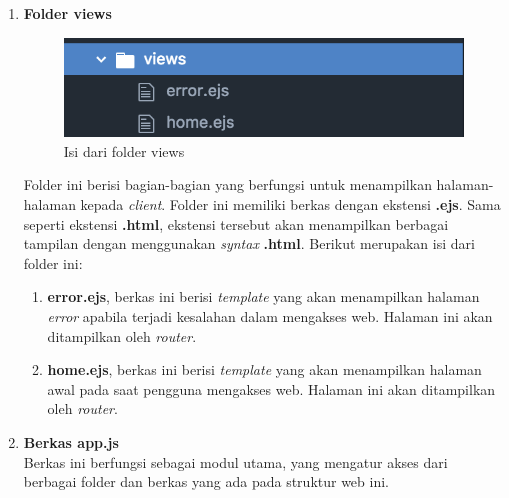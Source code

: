 \begin{enumerate}
	\item \textbf{Folder views} \\
	
	\begin{figure}[H]
		\centering
		\includegraphics[scale=0.4]{Gambar/direktori_views}
		\caption{Isi dari folder views}
		\label{fig:direktori_views}
	\end{figure}
	
	Folder ini berisi bagian-bagian yang berfungsi untuk menampilkan halaman-halaman kepada \textit{client}. Folder ini memiliki berkas dengan ekstensi \textbf{.ejs}. Sama seperti ekstensi \textbf{.html}, ekstensi tersebut akan menampilkan berbagai tampilan dengan menggunakan \textit{syntax} \textbf{.html}. Berikut merupakan isi dari folder ini:
	
	\begin{enumerate}
		\item \textbf{error.ejs}, berkas ini berisi \textit{template} yang akan menampilkan halaman \textit{error} apabila terjadi kesalahan dalam mengakses web. Halaman ini akan ditampilkan oleh \textit{router}.
		
		\item \textbf{home.ejs}, berkas ini berisi \textit{template} yang akan menampilkan halaman awal pada saat pengguna mengakses web. Halaman ini akan ditampilkan oleh \textit{router}.
	\end{enumerate}
	
	
	\item \textbf{Berkas app.js} \\ 
	Berkas ini berfungsi sebagai modul utama, yang mengatur akses dari berbagai folder dan berkas yang ada pada struktur web ini.
	
	
	
\end{enumerate}